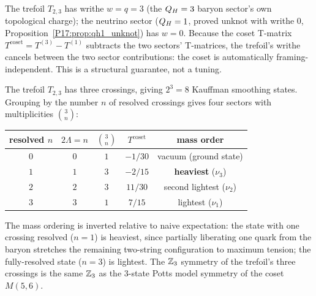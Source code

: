 \begin{remark}
\label{P17:rem:framing}
The trefoil $T_{2,3}$ has writhe $w=q=3$ (the $Q_H=3$ baryon sector's own
topological charge); the neutrino sector ($Q_H=1$, proved unknot with
writhe $0$, Proposition~\ref{P17:prop:qh1_unknot}) has $w=0$. Because the
coset T-matrix $T^{\mathrm{coset}}=T^{(3)}-T^{(1)}$ subtracts the two
sectors' T-matrices, the trefoil's writhe cancels between the two sector
contributions: the coset is automatically framing-independent. This is
a structural guarantee, not a tuning.
\end{remark}

\begin{remark}
\label{P17:rem:kauffman}
The trefoil $T_{2,3}$ has three crossings, giving $2^3=8$ Kauffman
smoothing states. Grouping by the number $n$ of resolved crossings gives
four sectors with multiplicities $\binom3n$:
\begin{center}
\renewcommand{\arraystretch}{1.3}
\begin{tabular}{ccccc}
\toprule
resolved $n$ & $2\Lambda=n$ & $\binom3n$ & $T^{\mathrm{coset}}$ & mass order \\
\midrule
$0$ & $0$ & $1$ & $-1/30$ & vacuum (ground state) \\
$1$ & $1$ & $3$ & $-2/15$ & \textbf{heaviest} ($\nu_3$) \\
$2$ & $2$ & $3$ & $11/30$ & second lightest ($\nu_2$) \\
$3$ & $3$ & $1$ & $7/15$ & lightest ($\nu_1$) \\
\bottomrule
\end{tabular}
\end{center}
The mass ordering is inverted relative to naive expectation: the state
with one crossing resolved ($n=1$) is heaviest, since partially
liberating one quark from the baryon stretches the remaining two-string
configuration to maximum tension; the fully-resolved state ($n=3$) is
lightest. The $\mathbb{Z}_3$ symmetry of the trefoil's three crossings is the
same $\mathbb{Z}_3$ as the 3-state Potts model symmetry of the coset
$M(5,6)$.
\end{remark}

